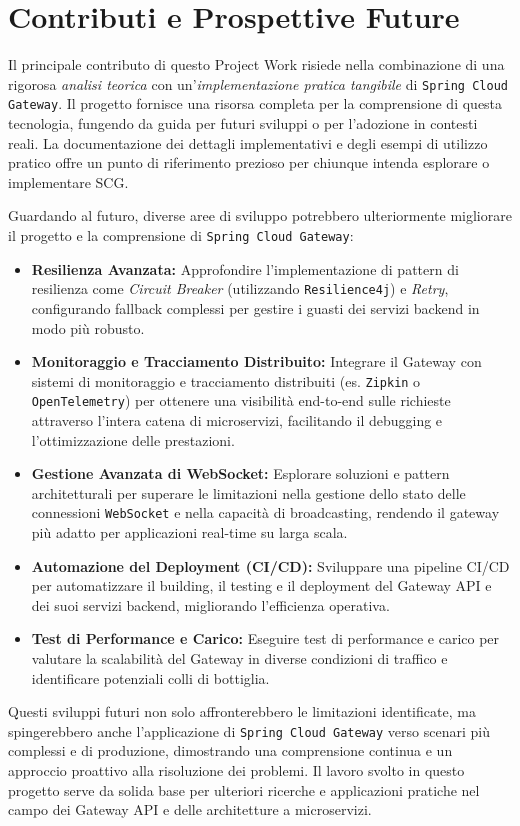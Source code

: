 \section{Contributi e Prospettive Future}

Il principale contributo di questo Project Work risiede nella combinazione di una rigorosa \emph{analisi teorica} con un'\emph{implementazione pratica tangibile} di \texttt{Spring Cloud Gateway}. Il progetto fornisce una risorsa completa per la comprensione di questa tecnologia, fungendo da guida per futuri sviluppi o per l'adozione in contesti reali. La documentazione dei dettagli implementativi e degli esempi di utilizzo pratico offre un punto di riferimento prezioso per chiunque intenda esplorare o implementare \textsc{SCG}.

Guardando al futuro, diverse aree di sviluppo potrebbero ulteriormente migliorare il progetto e la comprensione di \texttt{Spring Cloud Gateway}:

\begin{itemize}
    \item \textbf{Resilienza Avanzata:} Approfondire l'implementazione di pattern di resilienza come \emph{Circuit Breaker} (utilizzando \texttt{Resilience4j}) e \emph{Retry}, configurando fallback complessi per gestire i guasti dei servizi backend in modo più robusto.
    \item \textbf{Monitoraggio e Tracciamento Distribuito:} Integrare il Gateway con sistemi di monitoraggio e tracciamento distribuiti (es. \texttt{Zipkin} o \texttt{OpenTelemetry}) per ottenere una visibilità end-to-end sulle richieste attraverso l'intera catena di microservizi, facilitando il debugging e l'ottimizzazione delle prestazioni.
    \item \textbf{Gestione Avanzata di WebSocket:} Esplorare soluzioni e pattern architetturali per superare le limitazioni nella gestione dello stato delle connessioni \texttt{WebSocket} e nella capacità di broadcasting, rendendo il gateway più adatto per applicazioni real-time su larga scala.
    \item \textbf{Automazione del Deployment (\textsc{CI/CD}):} Sviluppare una pipeline \textsc{CI/CD} per automatizzare il building, il testing e il deployment del Gateway API e dei suoi servizi backend, migliorando l'efficienza operativa.
    \item \textbf{Test di Performance e Carico:} Eseguire test di performance e carico per valutare la scalabilità del Gateway in diverse condizioni di traffico e identificare potenziali colli di bottiglia.
\end{itemize}

Questi sviluppi futuri non solo affronterebbero le limitazioni identificate, ma spingerebbero anche l'applicazione di \texttt{Spring Cloud Gateway} verso scenari più complessi e di produzione, dimostrando una comprensione continua e un approccio proattivo alla risoluzione dei problemi. Il lavoro svolto in questo progetto serve da solida base per ulteriori ricerche e applicazioni pratiche nel campo dei Gateway API e delle architetture a microservizi.